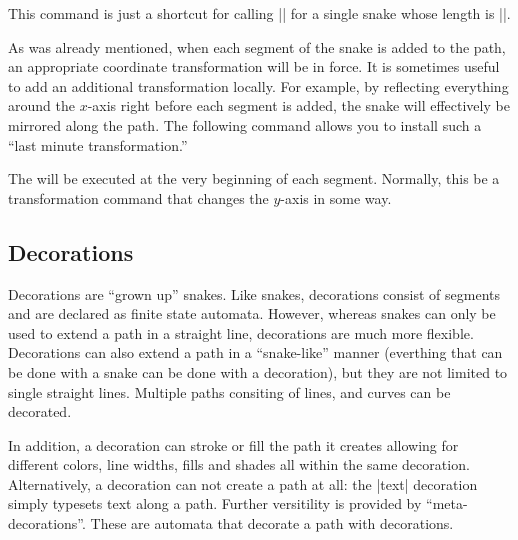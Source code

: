 \begin{command}{\pgfpathsnaketo{}}
  This command is just a shortcut for calling |\pgfpathsnakesto| for a
  single snake whose length is |\pgfsnakeremainingdistance|.
\begin{codeexample}[]
\end{codeexample}
\end{command}

As was already mentioned, when each segment of the snake is added to
the path, an appropriate coordinate transformation will be in
force. It is sometimes useful to add an additional transformation
locally. For example, by reflecting everything around the $x$-axis
right before each segment is added, the snake will effectively be
mirrored along the path. The following command allows you to install
such a ``last minute transformation.''

\begin{command}{\pgfsetsnakesegmenttransformation{}}
  The  will be executed at the very beginning of each
  segment. Normally, this be a transformation command that changes the
  $y$-axis in some way.
\end{command}


\subsection{Decorations}
\label{section-base-decorations}

Decorations are ``grown up'' snakes. Like snakes,
decorations consist of segments and are declared as finite 
state automata. However, whereas snakes can
only be used to extend a path in a straight line, decorations
are much more flexible. Decorations can also extend a path in a
``snake-like'' manner (everthing that can be done with a snake
can be done with a decoration), but they are not limited to
single straight lines. Multiple paths consiting of lines, and 
curves can be decorated. 

In addition, a decoration can stroke or fill the path it creates 
allowing for different colors, line widths, fills and shades all 
within the same decoration. Alternatively, a decoration can not 
create a path at all: the |text| decoration simply typesets text
along a path.
Further versitility is provided by ``meta-decorations''. These
are automata that decorate a path with decorations.

